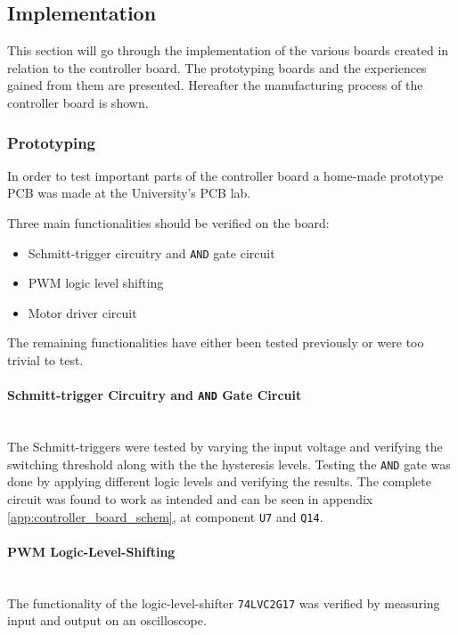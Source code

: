 \subsection{Implementation} %
\label{sub:controller_implementation}
This section will go through the implementation of the various boards created in relation to the controller board.
The prototyping boards and the experiences gained from them are presented.
Hereafter the manufacturing process of the controller board is shown.

\subsubsection{Prototyping}
\label{sub:controller_board_prototyping}
In order to test important parts of the controller board a home-made prototype PCB was made at the University's PCB lab.

Three main functionalities should be verified on the board:

\begin{itemize}
	\item Schmitt-trigger circuitry and \texttt{AND} gate circuit
	\item PWM logic level shifting
	\item Motor driver circuit
\end{itemize}

The remaining functionalities have either been tested previously or were too trivial to test. 

\paragraph{Schmitt-trigger Circuitry and \texttt{AND} Gate Circuit}~\\
The Schmitt-triggers were tested by varying the input voltage and verifying the switching threshold along with the the hysteresis levels. 
Testing the \texttt{AND} gate was done by applying different logic levels and verifying the results.
The complete circuit was found to work as intended and can be seen in appendix \ref{app:controller_board_schem}, at component \texttt{U7} and \texttt{Q14}.

\paragraph{PWM Logic-Level-Shifting}~\\
The functionality of the logic-level-shifter \texttt{74LVC2G17} was verified by measuring input and output on an oscilloscope. 

